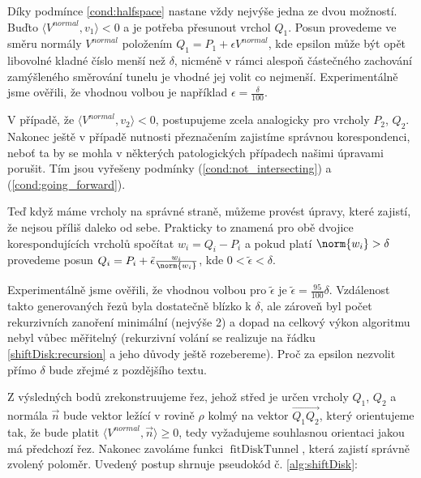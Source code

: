 Díky podmínce \ref{cond:halfspace} nastane vždy nejvýše jedna
ze dvou možností. Buďto $ \langle V^{normal}, v_1\rangle < 0 $ a je potřeba
přesunout vrchol $ Q_1 $. Posun provedeme ve směru normály $ V^{normal} $ položením
$ Q_1 = P_1 + \epsilon V^{normal} $, kde epsilon může být opět libovolné
kladné číslo menší než $ \delta $, nicméně v rámci alespoň částečného zachování
zamýšleného směrování tunelu je vhodné jej volit co nejmenší. Experimentálně
jsme ověřili, že vhodnou volbou je například $ \epsilon = \frac{\delta}{100} $.

V případě, že $ \langle V^{normal}, v_2\rangle < 0 $, postupujeme zcela analogicky
pro vrcholy $ P_2 $, $ Q_2 $. Nakonec ještě v případě nutnosti přeznačením
zajistíme správnou korespondenci, neboť ta by se mohla v některých patologických
případech našimi úpravami porušit. Tím jsou vyřešeny podmínky
(\ref{cond:not_intersecting}) a (\ref{cond:going_forward}).

Teď když máme vrcholy na správné straně, můžeme provést úpravy, které zajistí,
že nejsou příliš daleko od sebe. Prakticky to znamená pro obě dvojice
korespondujících vrcholů spočítat $ w_i = Q_i - P_i $ a pokud platí
$ \norm{w_i} > \delta $ provedeme posun
$ Q_i = P_i + \tilde{\epsilon} \frac{w_i}{\norm{w_i}} $, kde
$ 0 < \tilde{\epsilon} < \delta $.

Experimentálně jsme ověřili, že vhodnou volbou pro $ \tilde{\epsilon} $ je
$ \tilde{\epsilon} = \frac{95}{100} \delta$. Vzdálenost takto generovaných řezů
byla dostatečně blízko k $ \delta $, ale zároveň byl počet rekurzivních zanoření
minimální (nejvýše 2) a dopad na celkový výkon algoritmu nebyl vůbec měřitelný
(rekurzivní volání se realizuje na řádku \ref{shiftDisk:recursion} a jeho důvody
ještě rozebereme). Proč za epsilon nezvolit přímo $ \delta $ bude zřejmé z
pozdějšího textu.

Z výsledných bodů zrekonstruujeme řez, jehož střed je určen vrcholy
$ Q_1 $, $ Q_2 $ a normála $ \vec{n} $ bude vektor ležící v rovině $ \rho $
kolmý na vektor $ \overrightarrow{Q_1 Q_2} $, který orientujeme tak, že bude platit
$ \langle V^{normal}, \vec{n} \rangle \geq 0 $, tedy vyžadujeme souhlasnou
orientaci jakou má předchozí řez. Nakonec zavoláme funkci
$ \operatorname{fitDiskTunnel} $, která zajistí správně zvolený poloměr.
Uvedený postup shrnuje pseudokód č. \ref{alg:shiftDisk}:


